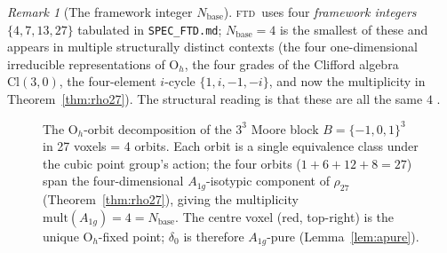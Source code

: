 \documentclass[11pt,reqno]{amsart}
\theoremstyle{plain}
\theoremstyle{definition}
\theoremstyle{remark}
\newtheorem{remark}[theorem]{Remark}
\numberwithin{equation}{section}
\newcommand{\Ohgrp}{\mathrm{O}_h}
\newcommand{\Aoneg}{A_{1g}}
\newcommand{\Nbase}{N_{\mathrm{base}}}
\newcommand{\FTD}{\textsc{ftd}}
\begin{document}
\begin{remark}[The framework integer $\Nbase$]
\FTD\ uses four \emph{framework integers} $\{4, 7, 13, 27\}$ tabulated
in \texttt{SPEC\_FTD.md}; $\Nbase = 4$ is the smallest of these and
appears in multiple structurally distinct contexts (the four
one-dimensional irreducible representations of $\Ohgrp$, the four grades
of the Clifford algebra $\mathrm{Cl}(3,0)$, the four-element $i$-cycle
$\{1, i, -1, -i\}$, and now the multiplicity in
Theorem~\ref{thm:rho27}). The structural reading is that these are
all the same $4$ \cite{spinedoc}.
\end{remark}

\begin{figure}[h]
\centering
{}
\caption{The $\Ohgrp$-orbit decomposition of the $3^{3}$ Moore block
$B = \{-1, 0, 1\}^{3}$ in 27 voxels = 4 orbits.
Each orbit is a single equivalence class under the cubic point group's
action; the four orbits ($1 + 6 + 12 + 8 = 27$) span the four-dimensional
$\Aoneg$-isotypic component of $\rho_{27}$ (Theorem~\ref{thm:rho27}),
giving the multiplicity $\mathrm{mult}(\Aoneg) = 4 = \Nbase$.
The centre voxel (red, top-right) is the unique $\Ohgrp$-fixed point;
$\delta_{0}$ is therefore $\Aoneg$-pure (Lemma~\ref{lem:apure}).}
\label{fig:27block}
\end{figure}
\end{document}
